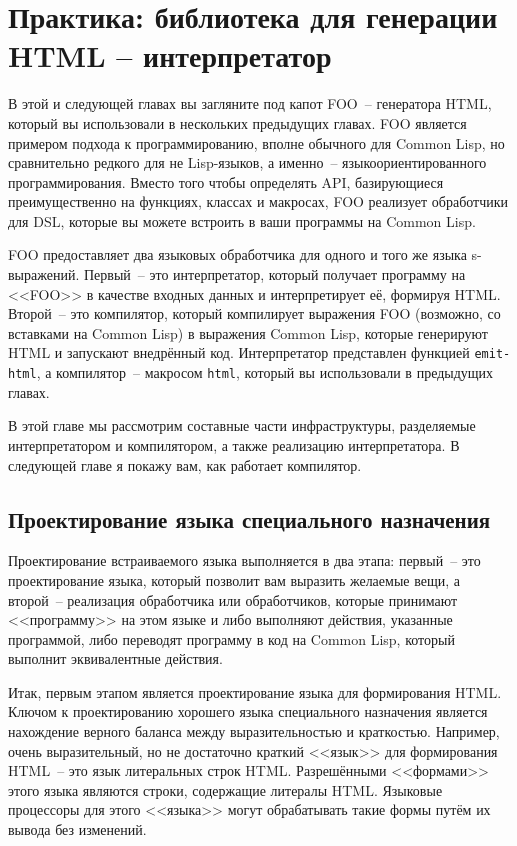 \chapter{Практика: библиотека для генерации HTML -- интерпретатор}
\label{ch:30}

\thispagestyle{empty}

В этой и следующей главах вы загляните под капот FOO~-- генератора HTML, который вы
использовали в нескольких предыдущих главах. FOO является примером подхода к
программированию, вполне обычного для Common Lisp, но сравнительно редкого для не
Lisp-языков, а именно~-- языкоориентированного программирования. Вместо того чтобы
определять API, базирующиеся преимущественно на функциях, классах и макросах, FOO
реализует обработчики для DSL, которые вы можете встроить в ваши программы на Common Lisp.

FOO предоставляет два языковых обработчика для одного и того же языка
s-выражений. Первый~-- это интерпретатор, который получает программу на <<FOO>> в качестве
входных данных и интерпретирует её, формируя HTML. Второй~-- это компилятор, который
компилирует выражения FOO (возможно, со вставками на Common Lisp) в выражения Common Lisp,
которые генерируют HTML и запускают внедрённый код. Интерпретатор представлен функцией
\lstinline{emit-html}, а компилятор~-- макросом \lstinline{html}, который вы использовали в
предыдущих главах.

В этой главе мы рассмотрим составные части инфраструктуры, разделяемые интерпретатором и
компилятором, а также реализацию интерпретатора. В следующей главе я покажу вам, как
работает компилятор.

\section{Проектирование языка специального назначения}

Проектирование встраиваемого языка выполняется в два этапа: первый~-- это проектирование
языка, который позволит вам выразить желаемые вещи, а второй~-- реализация обработчика
или обработчиков, которые принимают <<программу>> на этом языке и либо выполняют действия,
указанные программой, либо переводят программу в код на Common Lisp, который выполнит
эквивалентные действия.

Итак, первым этапом является проектирование языка для формирования HTML. Ключом к
проектированию хорошего языка специального назначения является нахождение верного баланса
между выразительностью и краткостью. Например, очень выразительный, но не достаточно
краткий <<язык>> для формирования HTML~-- это язык литеральных строк HTML. Разрешёнными
<<формами>> этого языка являются строки, содержащие литералы HTML.  Языковые процессоры
для этого <<языка>> могут обрабатывать такие формы путём их вывода без изменений.

